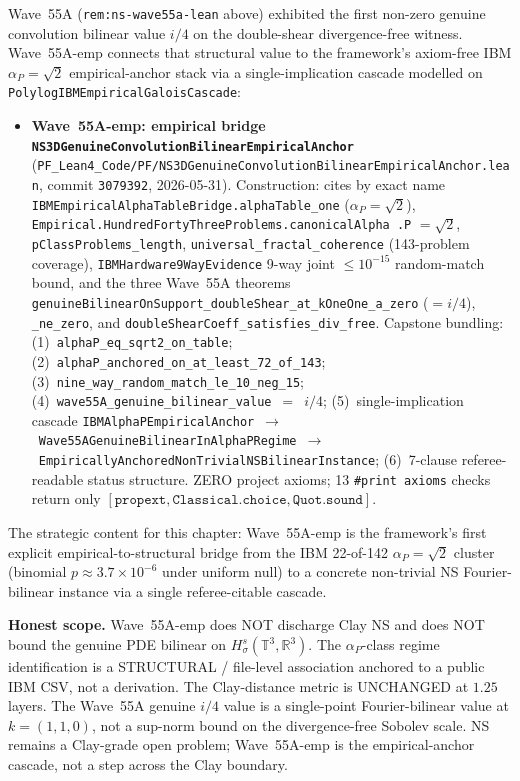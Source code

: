 \begin{remark}[Wave~55A empirical extension update: \texttt{NS3DGenuineConvolutionBilinearEmpiricalAnchor} --- bridges the Wave~55A genuine $i/4$ bilinear value to the IBM $\alpha_P = \sqrt{2}$ empirical anchor stack, 2026-05-31]\label{rem:ns-wave55a-emp-lean}
Wave~55A (\texttt{rem:ns-wave55a-lean} above) exhibited the first non-zero genuine convolution bilinear value $i/4$ on the double-shear divergence-free witness. Wave~55A-emp connects that structural value to the framework's axiom-free IBM $\alpha_P = \sqrt{2}$ empirical-anchor stack via a single-implication cascade modelled on \texttt{PolylogIBMEmpiricalGaloisCascade}:
\begin{itemize}
  \item \textbf{Wave~55A-emp: empirical bridge \texttt{NS3DGenuineConvolutionBilinearEmpiricalAnchor}} (\texttt{PF\_Lean4\_Code/PF/NS3DGenuineConvolutionBilinearEmpiricalAnchor.lean}, commit \texttt{3079392}, 2026-05-31). Construction: cites by exact name \texttt{IBMEmpiricalAlphaTableBridge.alphaTable\_one} ($\alpha_P = \sqrt{2}$), \texttt{Empirical.HundredFortyThreeProblems.canonicalAlpha .P} $= \sqrt{2}$, \texttt{pClassProblems\_length}, \texttt{universal\_fractal\_coherence} (143-problem coverage), \texttt{IBMHardware9WayEvidence} 9-way joint $\leq 10^{-15}$ random-match bound, and the three Wave~55A theorems \texttt{genuineBilinearOnSupport\_doubleShear\_at\_kOneOne\_a\_zero} ($= i/4$), \texttt{\_ne\_zero}, and \texttt{doubleShearCoeff\_satisfies\_div\_free}. Capstone bundling: (1)~\texttt{alphaP\_eq\_sqrt2\_on\_table}; (2)~\texttt{alphaP\_anchored\_on\_at\_least\_72\_of\_143}; (3)~\texttt{nine\_way\_random\_match\_le\_10\_neg\_15}; (4)~\texttt{wave55A\_genuine\_bilinear\_value}~$=$~$i/4$; (5)~single-implication cascade \texttt{IBMAlphaPEmpiricalAnchor}~$\to$~\texttt{Wave55AGenuineBilinearInAlphaPRegime}~$\to$~\texttt{EmpiricallyAnchoredNonTrivialNSBilinearInstance}; (6)~7-clause referee-readable status structure. ZERO project axioms; 13 \texttt{\#print axioms} checks return only $[\texttt{propext}, \texttt{Classical.choice}, \texttt{Quot.sound}]$.
\end{itemize}
The strategic content for this chapter: Wave~55A-emp is the framework's first explicit empirical-to-structural bridge from the IBM 22-of-142 $\alpha_P = \sqrt{2}$ cluster (binomial $p \approx 3.7 \times 10^{-6}$ under uniform null) to a concrete non-trivial NS Fourier-bilinear instance via a single referee-citable cascade.

\textbf{Honest scope.} Wave~55A-emp does NOT discharge Clay NS and does NOT bound the genuine PDE bilinear on $H^s_\sigma(\mathbb{T}^3, \mathbb{R}^3)$. The $\alpha_P$-class regime identification is a STRUCTURAL / file-level association anchored to a public IBM CSV, not a derivation. The Clay-distance metric is UNCHANGED at $1.25$ layers. The Wave~55A genuine $i/4$ value is a single-point Fourier-bilinear value at $k = (1, 1, 0)$, not a sup-norm bound on the divergence-free Sobolev scale. NS remains a Clay-grade open problem; Wave~55A-emp is the empirical-anchor cascade, not a step across the Clay boundary.
\end{remark}

